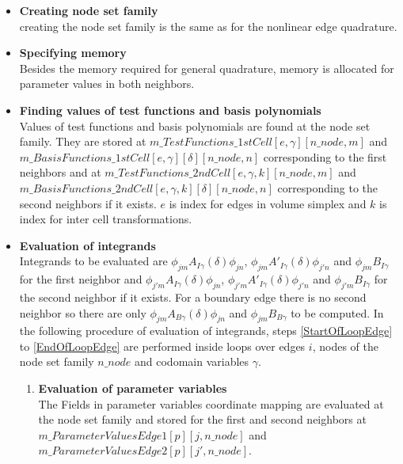 \documentclass[BoSSSForSolvingConservationLaws.tex]{subfiles}
\begin{document}
\begin{itemize}
\item \textbf{Creating node set family}\\
creating the node set family is the same as for the nonlinear edge quadrature.
\item \textbf{Specifying memory}\\
Besides the memory required for general quadrature, memory is allocated for parameter values in both neighbors.
\item \textbf{Finding values of test functions and basis polynomials}\\
Values of test functions and basis polynomials are found at the node set family. They are stored at $m\_TestFunctions\_1stCell[e, \gamma][n\_node,m]$ and \\$m\_BasisFunctions\_1stCell[e, \gamma][\delta][n\_node,n]$ corresponding to the first neighbors and at $m\_TestFunctions\_2ndCell[e, \gamma, k][n\_node,m]$ and \\$m\_BasisFunctions\_2ndCell[e, \gamma, k][\delta][n\_node,n]$ corresponding to the second neighbors if it exists. $e$ is index for edges in volume simplex and $k$ is index for inter cell transformations.
\item \textbf{Evaluation of integrands}\\
Integrands to be evaluated are $\phi_{jm} A_{I\gamma}(\delta) \phi_{jn}$, $\phi_{jm} A'_{I\gamma}(\delta) \phi_{j'n}$ and $\phi_{jm} B_{I\gamma}$ for the first neighbor and $\phi_{j'm} A_{I\gamma}(\delta) \phi_{jn}$, $\phi_{j'm} A'_{I\gamma}(\delta) \phi_{j'n}$ and $\phi_{j'm} B_{I\gamma}$ for the second neighbor if it exists. For a boundary edge there is no second neighbor so there are only $\phi_{jm} A_{B\gamma}(\delta) \phi_{jn}$ and $\phi_{jm} B_{B\gamma}$ to be computed. In the following procedure of evaluation of integrands, steps \ref{StartOfLoopEdge} to \ref{EndOfLoopEdge} are performed inside loops over edges $i$, nodes of the node set family $n\_node$ and codomain variables $\gamma$.
\begin{enumerate}
\item \textbf{Evaluation of parameter variables}\\
The Fields in parameter variables coordinate mapping are evaluated at the node set family and stored for the first and second neighbors at \\$m\_ParameterValuesEdge1[p][j,n\_node]$ and $m\_ParameterValuesEdge2[p][j',n\_node]$.

\end{enumerate}
\end{itemize}
\end{document}
